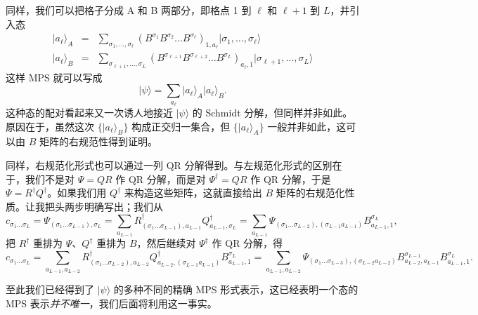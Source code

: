 \documentclass[a4paper,10pt,oneside,onecolumn,1p,times]{elsarticle}
\newcommand{\ket}[1]{\mbox{$| #1  \rangle$}}
\begin{document}
同样，我们可以把格子分成 A 和 B 两部分，即格点 1 到 $\ell$ 和 $\ell+1$ 到 $L$，并引入态
\begin{eqnarray}
\ket{a_\ell}_A &=& \sum_{\sigma_1,\ldots,\sigma_\ell} (B^{\sigma_1} B^{\sigma_2} \ldots B^{\sigma_\ell})_{1,a_\ell} \ket{\sigma_1,\ldots,\sigma_\ell} \\
\ket{a_\ell}_B &=& \sum_{\sigma_{\ell+1},\ldots,\sigma_L} (B^{\sigma_{\ell+1}} B^{\sigma_{\ell+2}} \ldots B^{\sigma_L})_{a_\ell,1} \ket{\sigma_{\ell+1},\ldots,\sigma_L}
\end{eqnarray}
这样 MPS 就可以写成
\begin{equation}
\ket{\psi} = \sum_{a_\ell} \ket{a_\ell}_A \ket{a_\ell}_B . 
\end{equation}
这种态的配对看起来又一次诱人地接近 $\ket{\psi}$ 的 Schmidt 分解，但同样并非如此。原因在于，虽然这次 $\{ \ket{a_\ell}_B \}$ 构成正交归一集合，但 $\{ \ket{a_\ell}_A \}$ 一般并非如此，这可以由 $B$ 矩阵的右规范性得到证明。

同样，右规范化形式也可以通过一列 QR 分解得到。与左规范化形式的区别在于，我们不是对 $\Psi=QR$ 作 QR 分解，而是对 $\Psi^\dagger=QR$ 作 QR 分解，于是 $\Psi = R^\dagger Q^\dagger$。如果我们用 $Q^\dagger$ 来构造这些矩阵，这就直接给出 $B$ 矩阵的右规范化性质。让我把头两步明确写出；我们从
\begin{equation}
c_{\sigma_1\ldots\sigma_L} = \Psi_{(\sigma_1\ldots\sigma_{L-1}),\sigma_L} =
\sum_{a_{L-1}} R^\dagger_{(\sigma_1\ldots\sigma_{L-1}),a_{L-1}} Q^\dagger_{a_{L-1},\sigma_L} =
\sum_{a_{L-1}} \Psi_{(\sigma_1\ldots\sigma_{L-2}),(\sigma_{L-1}a_{L-1})} B^{\sigma_L}_{a_{L-1},1},
\end{equation}
把 $R^\dagger$ 重排为 $\Psi$、$Q^\dagger$ 重排为 $B$，然后继续对 $\Psi^\dagger$ 作 QR 分解，得
\begin{equation}
c_{\sigma_1\ldots\sigma_L} = \sum_{a_{L-1},a_{L-2}} R^\dagger_{(\sigma_1\ldots\sigma_{L-2}),a_{L-2}} Q^\dagger_{a_{L-2},(\sigma_{L-1}a_{L-1})}  B^{\sigma_L}_{a_{L-1},1} 
= \sum_{a_{L-1},a_{L-2}} \Psi_{(\sigma_1\ldots\sigma_{L-3}),(\sigma_{L-2}a_{L-2})}
B^{\sigma_{L-1}}_{a_{L-2},a_{L-1}} B^{\sigma_L}_{a_{L-1},1} .
\end{equation}

至此我们已经得到了 $\ket{\psi}$ 的多种不同的精确 MPS 形式表示，这已经表明一个态的 MPS 表示{\em 并不唯一}，我们后面将利用这一事实。
\end{document}
